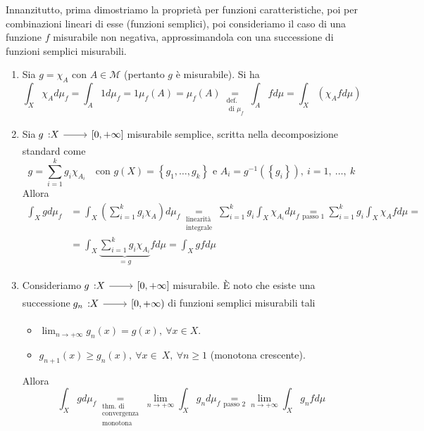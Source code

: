 \begin{demonstration}
	Innanzitutto, prima dimostriamo la proprietà per funzioni caratteristiche, poi per combinazioni lineari di esse (funzioni semplici), poi consideriamo il caso di una funzione $f$ misurabile non negativa, approssimandola con una successione di funzioni semplici misurabili.\\
	\begin{enumerate}[label=\Roman*]
		\item Sia $g=\chi_A$ con $A\in\mathcal{M}$ (pertanto $g$ è misurabile). Si ha
		\begin{equation*}
			\int_X\chi_Ad\mu_f=\int_A 1d\mu_f=1\mu_f\left(A\right)=\mu_f\left(A\right)\underset{\substack{\text{def.}\\\text{ di }\mu_f}}{=}\int_Afd\mu=\int_X\left(\chi_Afd\mu\right)
		\end{equation*}
		\item Sia $\funz{g}{X}{\left[0,+\infty\right]}$ misurabile semplice, scritta nella decomposizione standard come
		\begin{equation*}
			g=\sum_{i=1}^kg_i\chi_{A_i}\quad\text{con }g(X)=\left\{g_1,\ldots,g_k\right\}\text{ e }A_i=g^{-1}\left(\left\{g_i\right\}\right),\ i=1,\ \ldots,\ k
		\end{equation*}
	Allora
	\begin{align*}
			\int_Xgd\mu_f&=\int_X\left(\sum_{i=1}^kg_i\chi_A\right)d\mu_f \underset{\substack{\text{linearità} \\ \text{integrale} }}{=} \sum_{i=1}^{k}g_i\int_X\chi_{A_i}d\mu_f\underset{\text{passo }1}{=}\sum_{i=1}^{k}g_i\int_X\chi_Afd\mu=\\
			&=\int_X\underbrace{\sum_{i=1}^{k}g_i\chi_{A_i}}_{=g}fd\mu=\int_Xgfd\mu
	\end{align*}
	\item Consideriamo $\funz{g}{X}{\left[0,+\infty\right]}$ misurabile. È noto che esiste una successione $\funz{g_n}{X}{\left[0,+\infty\right)}$ di funzioni semplici misurabili tali
	\begin{itemize}
		\item $\displaystyle\lim_{n\to+\infty}g_n(x)=g(x),\ \forall x\in X$.
		\item $g_{n+1}(x)\geq g_n(x),\ \forall x\in\ X,\ \forall n\geq 1$ (monotona crescente).
	\end{itemize}
Allora
	\begin{equation*}
	\int_Xgd\mu_f\underset{\substack{\text{thm. di}\\\text{convergenza}\\\text{monotona}}}{=}\lim_{n\to+\infty}\int_Xg_nd\mu_f\underset{\text{passo }2}{=}\lim_{n\to+\infty}\int_Xg_nfd\mu

\end{equation*}
\end{enumerate}
\end{demonstration}
